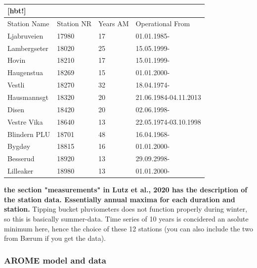 \\

\begin{center}
\begin{tabular}{ |p{3cm}||p{3cm}|p{3cm}|p{3cm}|  }[hbt!]
\hline
\multicolumn{4}{|c|}{Oslo Stations} \\
\hline
 Station Name & Station NR & Years AM & Operational From\\
 Ljabruveien & 17980  & 17 &  01.01.1985-\\
 Lambergseter & 18020 & 25 & 15.05.1999-\\
 Hovin & 18210 & 17 & 15.01.1999-\\
 Haugenstua & 18269 & 15 & 01.01.2000-\\
 Vestli & 18270 & 32 & 18.04.1974-\\
 Hausmannsgt & 18320 & 20 & 21.06.1984-04.11.2013\\
 Disen & 18420 & 20 & 02.06.1998-\\
 Vestre Vika & 18640 & 13 & 22.05.1974-03.10.1998\\
 Blindern PLU & 18701 & 48 & 16.04.1968-\\
 Bygdøy & 18815 & 16 & 01.01.2000-\\
 Besserud & 18920 & 13 & 29.09.2998-\\
 Lilleaker & 18980 & 13 & 01.01.2000-   
\end{tabular}
\end{center}

\textbf{the section "measurements" in Lutz et al., 2020 has the description of the station data. Essentially annual maxima for each duration and station.} Tipping bucket pluviometers does not function properly during winter, so this is basically summer-data. Time series of 10 years is concidered an asolute minimum here, hence the choice of these 12 stations (you can also include the two from Bærum if you get the data). 

\subsubsection{AROME model and data}

